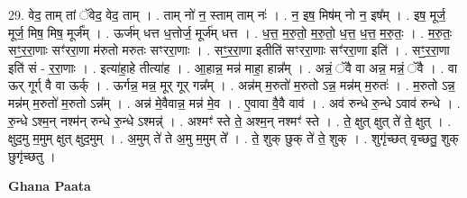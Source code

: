 \documentclass[17pt]{extarticle}
\begin{document}
29. वेद॒ ताम् तां ॅवेद॒ वेद॒ ताम् । . ताम् नो॑ न॒ स्ताम् ताम् नः॑ । . न॒ इष॒ मिष॑म् नो न॒ इष᳚म् । . इष॒ मूर्ज॒ मूर्ज॒ मिष॒ मिष॒ मूर्ज᳚म् । . ऊर्ज॑म् धत्त ध॒त्तोर्ज॒ मूर्ज॑म् धत्त । . ध॒त्त॒ म॒रु॒तो॒ म॒रु॒तो॒ ध॒त्त॒ ध॒त्त॒ म॒रु॒तः॒ । . म॒रु॒तः॒ सꣳ॒॒र॒रा॒णाः सꣳ॑ररा॒णा म॑रुतो मरुतः सꣳररा॒णाः । . सꣳ॒॒र॒रा॒णा इतीति॑ सꣳररा॒णाः सꣳ॑ररा॒णा इति॑ । . सꣳ॒॒र॒रा॒णा इति॑ सं - र॒रा॒णाः । . इत्या॑हा॒हे तीत्या॑ह । . आ॒हान्न॒ मन्न॑ माहा॒ हान्न᳚म् । . अन्नं॒ ॅवै वा अन्न॒ मन्नं॒ ॅवै । . वा ऊर् गूर्ग् वै वा ऊर्क् । . ऊर्गन्न॒ मन्न॒ मूर् गूर् गन्न᳚म् । . अन्न॑म् म॒रुतो॑ म॒रुतो ऽन्न॒ मन्न॑म् म॒रुतः॑ । . म॒रुतो ऽन्न॒ मन्न॑म् म॒रुतो॑ म॒रुतो ऽन्न᳚म् । . अन्न॑ मे॒वैवान्न॒ मन्न॑ मे॒व । . ए॒वावा वै॒वै वाव॑ । . अव॑ रुन्धे रु॒न्धे ऽवाव॑ रुन्धे । . रु॒न्धे ऽश्म॒न् नश्म॑न् रुन्धे रु॒न्धे ऽश्मन्न्॑ । . अश्मꣳ॑ स्ते ते॒ अश्म॒न् नश्मꣳ॑ स्ते । . ते॒ क्षुत् क्षुत् ते॑ ते॒ क्षुत् । . क्षुद॒मु म॒मुम् क्षुत् क्षुद॒मुम् । . अ॒मुम् ते॑ ते अ॒मु म॒मुम् ते᳚ । . ते॒ शुक् छुक् ते॑ ते॒ शुक् । . शुगृ॑च्छत् वृच्छतु॒ शुक् छुगृ॑च्छतु । \newline

\textbf{Ghana Paata } \newline
\end{document}
